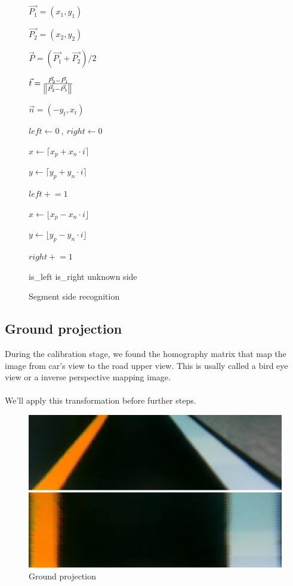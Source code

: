 \documentclass{article}
\begin{document}
\begin{figure} [ht]
\begin{algorithm}[H]
	$\vec{P_1} = (x_1, y_1)$

	$\vec{P_2} = (x_2, y_2)$

	$\vec{P} = (\vec{P_1} + \vec{P_2}) / 2$

	$\vec{t} = \frac{\vec{P_2} - \vec{P_1}}
					{\norm{\vec{P_2} - \vec{P_1}}}$

	$\vec{n} = (-y_t, x_t)$

	$left \gets 0 \ , \ right \gets 0$

	 {
		$x \gets \lceil x_p + x_n \cdot i \rceil$

		$y \gets \lceil y_p + y_n \cdot i \rceil$
	
			{
				$left \mathrel{+}= 1$ 
			}
			
		$x \gets \lfloor x_p - x_n \cdot i \rfloor$

		$y \gets \lfloor y_p - y_n \cdot i \rfloor$
		
			{
				$right \mathrel{+}= 1$ 
			}
	}
	
		{
			\Return is\_left
		}
		{
			\Return is\_right
		}
	\uElse
		{
			\Return unknown side
		} 
	\caption{Segment side recognition}
\end{algorithm}
\end{figure}
\FloatBarrier

\subsection{Ground projection}

During the calibration stage, we found the homography matrix that map the image from car's view to the road upper view. This is usally called a bird eye view or a inverse perspective mapping image.
\\
\\
\noindent We'll apply this transformation before further steps.

\begin{figure}[ht]
  \label{fig:ground projection}
  \centering
  \includegraphics[scale=0.7]{graphs/ground_project.png}
  \caption{Ground projection}
\end{figure}
\FloatBarrier
\end{document}
